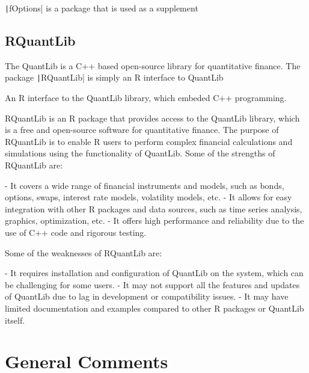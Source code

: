 \texttt|fOptions| is a package that is used as a supplement

\subsection{RQuantLib} \label{sub:RQuantLib}

The QuantLib is a C++ based open-source library for quantitative finance. The package \texttt|RQuantLib| is simply an R interface to QuantLib


An R interface to the QuantLib library, which embeded C++ programming.

RQuantLib is an R package that provides access to the QuantLib library, which is a free and open-source software for quantitative finance. The purpose of RQuantLib is to enable R users to perform complex financial calculations and simulations using the functionality of QuantLib. Some of the strengths of RQuantLib are:

- It covers a wide range of financial instruments and models, such as bonds, options, swaps, interest rate models, volatility models, etc.
- It allows for easy integration with other R packages and data sources, such as time series analysis, graphics, optimization, etc.
- It offers high performance and reliability due to the use of C++ code and rigorous testing.

Some of the weaknesses of RQuantLib are:

- It requires installation and configuration of QuantLib on the system, which can be challenging for some users.
- It may not support all the features and updates of QuantLib due to lag in development or compatibility issues.
- It may have limited documentation and examples compared to other R packages or QuantLib itself.

\section{General Comments}

\newpage